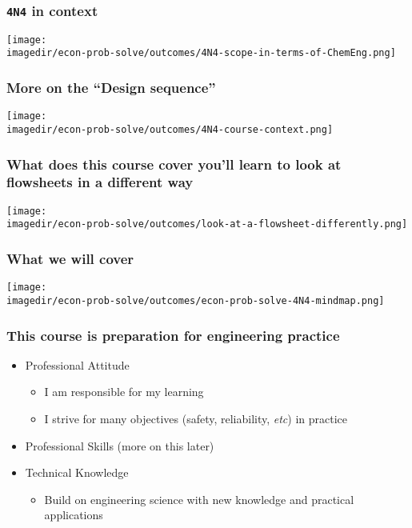 \begin{frame}\frametitle{\texttt{4N4} in context}
	\begin{center}
		\texttt{[image: \\imagedir/econ-prob-solve/outcomes/4N4-scope-in-terms-of-ChemEng.png]}
	\end{center}
\end{frame}

\begin{frame}\frametitle{More on the ``Design sequence''}
	\begin{center}
		\texttt{[image: \\imagedir/econ-prob-solve/outcomes/4N4-course-context.png]}
	\end{center}
\end{frame}

\begin{frame}\frametitle{What does this course cover {\scriptsize you'll learn to look at flowsheets in a different way}}
	\begin{center}
		\texttt{[image: \\imagedir/econ-prob-solve/outcomes/look-at-a-flowsheet-differently.png]}
	\end{center}
\end{frame}

\begin{frame}\frametitle{What we will cover}
	\begin{center}
		\texttt{[image: \\imagedir/econ-prob-solve/outcomes/econ-prob-solve-4N4-mindmap.png]}
	\end{center}
\end{frame}

\begin{frame}\frametitle{This course is preparation for engineering practice}
	\begin{itemize}
		\item	Professional Attitude 
		\begin{itemize}
			\item	I am responsible for my learning
			\item	I strive for many objectives (safety, reliability, \emph{etc}) in practice
		\end{itemize}
		\item	Professional Skills (more on this later)
		\item	Technical Knowledge
		\begin{itemize}
			\item	Build on engineering science with new knowledge and practical applications
		\end{itemize}
	\end{itemize}
\end{frame}


